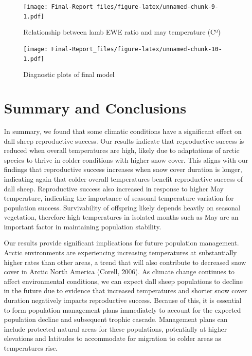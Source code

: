 \documentclass[
  12pt,
]{article}
\begin{document}
\begin{figure}
\centering
\texttt{[image: Final-Report\_files/figure-latex/unnamed-chunk-9-1.pdf]}
\caption{Relationship between lamb EWE ratio and may temperature (Cº)}
\end{figure}

\begin{figure}
\centering
\texttt{[image: Final-Report\_files/figure-latex/unnamed-chunk-10-1.pdf]}
\caption{Diagnostic plots of final model}
\end{figure}

\newpage

\hypertarget{summary-and-conclusions}{%
\section{Summary and Conclusions}\label{summary-and-conclusions}}

In summary, we found that some climatic conditions have a significant
effect on dall sheep reproductive success. Our results indicate that
reproductive success is reduced when overall temperatures are high,
likely due to adaptations of arctic species to thrive in colder
conditions with higher snow cover. This aligns with our findings that
reproductive success increases when snow cover duration is longer,
indicating again that colder overall temperatures benefit reproductive
success of dall sheep. Reproductive success also increased in response
to higher May temperature, indicating the importance of seasonal
temperature variation for population success. Survivability of offspring
likely depends heavily on seasonal vegetation, therefore high
temperatures in isolated months such as May are an important factor in
maintaining population stability.

Our results provide significant implications for future population
management. Arctic environments are experiencing increasing temperatures
at substantially higher rates than other areas, a trend that will also
contribute to decreased snow cover in Arctic North America (Corell,
2006). As climate change continues to affect environmental conditions,
we can expect dall sheep populations to decline in the future due to
evidence that increased temperatures and shorter snow cover duration
negatively impacts reproductive success. Because of this, it is
essential to form population management plans immediately to account for
the expected population decline and subsequent trophic cascade.
Management plans can include protected natural areas for these
populations, potentially at higher elevations and latitudes to
accommodate for migration to colder areas as temperatures rise.
\end{document}
